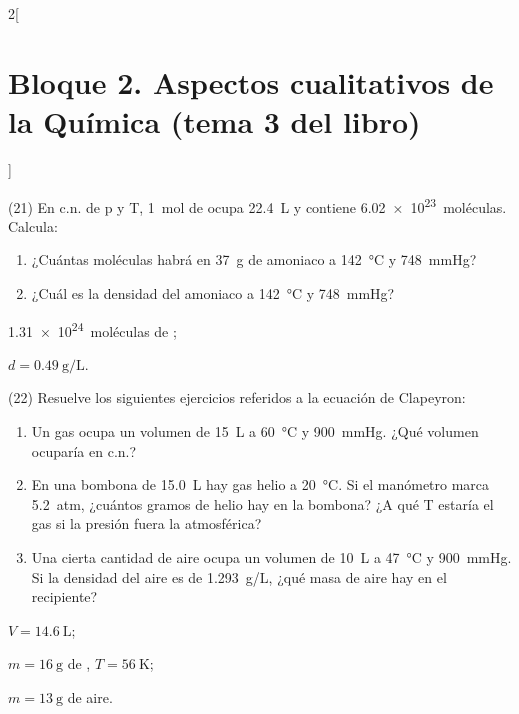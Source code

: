 \documentclass[10pt]{article}
\begin{document}
\begin{multicols}{2}[
    \section{Bloque 2. Aspectos cualitativos de la Química (tema 3 del libro)}
  ]
\begin{exercise}[
    tags    = {},
    topics  = {química,química básica},
    source  = {FQ 1B MGH 2016, p84, e21},
  ]
  (21) En c.n. de p y T, \SI{1}{mol} de  ocupa \SI{22.4}{\liter} y contiene \SI{6.02e23}{moléculas}. Calcula:
  \begin{enumerate}
    \item ¿Cuántas moléculas habrá en \SI{37}{\gram} de amoniaco a \SI{142}{\celsius} y \SI{748}{\mmHg}?
    \item ¿Cuál es la densidad del amoniaco a \SI{142}{\celsius} y \SI{748}{\mmHg}?
  \end{enumerate}
\end{exercise}

\begin{solution}
  \begin{enumerate*}
    \item \SI{1.31e24}{moléculas} de ; \item \( d = \SI{0.49}{\gram\per\liter} \).
  \end{enumerate*}
\end{solution}




\begin{exercise}[
    tags    = {},
    topics  = {química,química básica},
    source  = {FQ 1B MGH 2016, p84, e22},
  ]
  (22) Resuelve los siguientes ejercicios referidos a la ecuación de Clapeyron:
  \begin{enumerate}
    \item Un gas ocupa un volumen de \SI{15}{\liter} a \SI{60}{\celsius} y \SI{900}{\mmHg}. ¿Qué volumen ocuparía en c.n.?
    \item En una bombona de \SI{15.0}{\liter} hay gas helio a \SI{20}{\celsius}. Si el manómetro marca \SI{5.2}{atm}, ¿cuántos gramos de helio hay en la bombona? ¿A qué T estaría el gas si la presión fuera la atmosférica?
    \item Una cierta cantidad de aire ocupa un volumen de \SI{10}{\liter} a \SI{47}{\celsius} y \SI{900}{\mmHg}. Si la densidad del aire es de \SI{1.293}{g/L}, ¿qué masa de aire hay en el recipiente?
  \end{enumerate}
\end{exercise}

\begin{solution}
  \begin{enumerate*}
    \item \( V = \SI{14.6}{\liter} \); \item \( m = \SI{16}{\gram} \) de , \( T = \SI{56}{\kelvin} \); \item \( m = \SI{13}{\gram} \) de aire.
  \end{enumerate*}
\end{solution}






\end{multicols}
\end{document}
